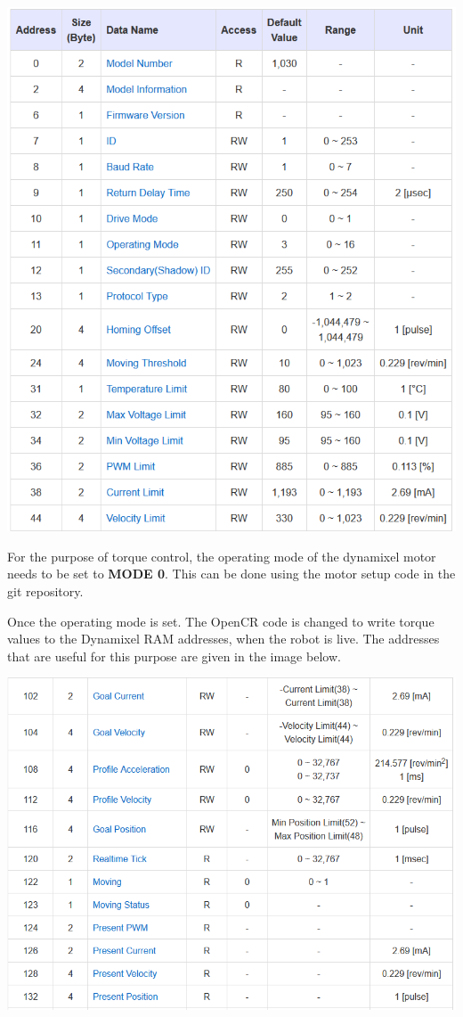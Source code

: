 \documentclass[12]{article}
\begin{document}
\begin{center}
	\includegraphics[width=0.7\linewidth]{images/dxl_eeprom.png}\\
\end{center}

For the purpose of torque control, the operating mode of the dynamixel motor needs to be set to \textbf{MODE 0}. This can be done using the motor setup code in the git repository.

Once the operating mode is set. The OpenCR code is changed to write torque values to the Dynamixel RAM addresses, when the robot is live. The addresses that are useful for this purpose are given in the image below.

\begin{center}
	\includegraphics[width=\linewidth]{images/dxl_control_table.png}\\
\end{center}
\end{document}
